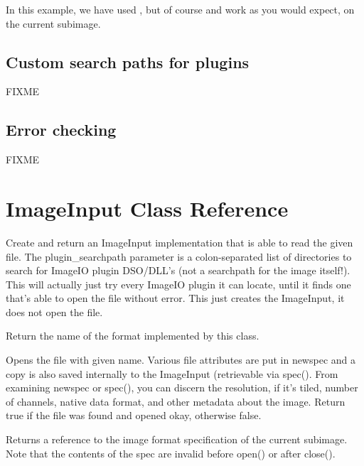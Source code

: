 In this example, we have used \readimage, but of course \readscanline
and \readtile work as you would expect, on the current subimage.


\subsection{Custom search paths for plugins}
\label{sec:imageinput:searchpaths}

FIXME


\subsection{Error checking}
\label{sec:imageinput:errors}

FIXME



\section{{\kw ImageInput} Class Reference}
\label{sec:imageinput:reference}

Create and return an {\kw ImageInput} implementation that is able
to read the given file.  The {\kw plugin_searchpath} parameter is a
colon-separated list of directories to search for ImageIO plugin
DSO/DLL's (not a searchpath for the image itself!).  This will
actually just try every ImageIO plugin it can locate, until it
finds one that's able to open the file without error.  This just
creates the {\kw ImageInput}, it does not open the file.
\apiend

Return the name of the format implemented by this class.
\apiend

Opens the file with given name.  Various file attributes are put in
{\kw newspec} and a copy is also saved internally to the
{\kw ImageInput} (retrievable via {\kw spec()}.  From examining
{\kw newspec} or {\kw spec()}, you can discern the resolution, if it's
tiled, number of channels, native data format, and other metadata about
the image.  Return {\kw true} if the file was found and opened okay,
otherwise {\kw false}.
\apiend

Returns a reference to the image format specification of the
current subimage.  Note that the contents of the spec are
invalid before {\kw open()} or after {\kw close()}.
\apiend

